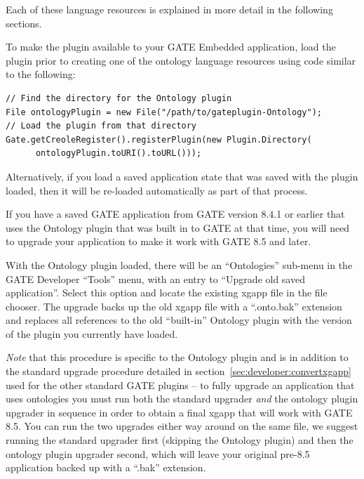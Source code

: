 Each of these language resources is explained in more detail in the following sections.

To make the plugin available to your GATE Embedded application, load the plugin
prior to creating one of the ontology language resources using code similar to
the following:
\begin{lstlisting}
// Find the directory for the Ontology plugin
File ontologyPlugin = new File("/path/to/gateplugin-Ontology");
// Load the plugin from that directory
Gate.getCreoleRegister().registerPlugin(new Plugin.Directory(
      ontologyPlugin.toURI().toURL()));
\end{lstlisting}

Alternatively, if you load a saved application state that was saved with the
plugin loaded, then it will be re-loaded automatically as part of that process.


If you have a saved GATE application from GATE version 8.4.1 or earlier that
uses the Ontology plugin that was built in to GATE at that time, you will need
to upgrade your application to make it work with GATE 8.5 and later.

With the Ontology plugin loaded, there will be an ``Ontologies'' sub-menu in
the GATE Developer ``Tools'' menu, with an entry to ``Upgrade old saved
application''.  Select this option and locate the existing xgapp file in the
file chooser.  The upgrade backs up the old xgapp file with a ``.onto.bak''
extension and replaces all references to the old ``built-in'' Ontology plugin
with the version of the plugin you currently have loaded.

\emph{Note} that this procedure is specific to the Ontology plugin and is in
addition to the standard upgrade procedure detailed in
section~\ref{sec:developer:convertxgapp} used for the other standard GATE
plugins -- to fully upgrade an application that uses ontologies you must run
both the standard upgrader \emph{and} the ontology plugin upgrader in sequence
in order to obtain a final xgapp that will work with GATE 8.5.  You can run the
two upgrades either way around on the same file, we suggest running the
standard upgrader first (skipping the Ontology plugin) and then the ontology
plugin upgrader second, which will leave your original pre-8.5 application
backed up with a ``.bak'' extension.


